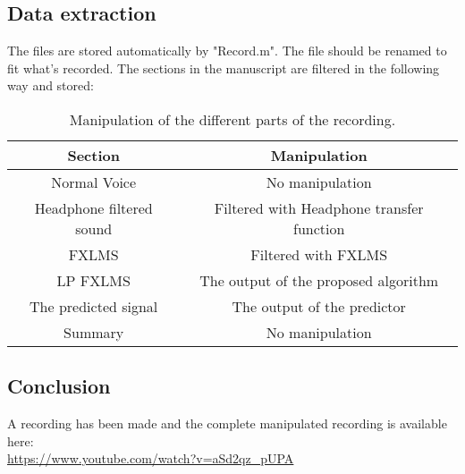 \subsection{Data extraction}
The files are stored automatically by "Record.m". The file should be renamed to fit what's recorded. 
The sections in the manuscript are filtered in the following way and stored:
\begin{table}[H]
	\centering
	\begin{tabular}{ c c } \toprule
		{Section}				& {Manipulation} \\ \bottomrule 
		Normal Voice			& No manipulation  	\\
		Headphone filtered sound& Filtered with Headphone transfer function \\
		FXLMS					& Filtered with FXLMS	\\
		LP FXLMS 				& The output of the proposed algorithm	\\
		The predicted signal 	& The output of the predictor	\\
		Summary 				& No manipulation	\\
		\bottomrule
	\end{tabular}
	\caption{Manipulation of the different parts of the recording.}
	\label{tab:VoiceRecSections}
\end{table}



\subsection{Conclusion}
A recording has been made and the complete manipulated recording is available here: \\
\url{https://www.youtube.com/watch?v=aSd2qz_pUPA} 











